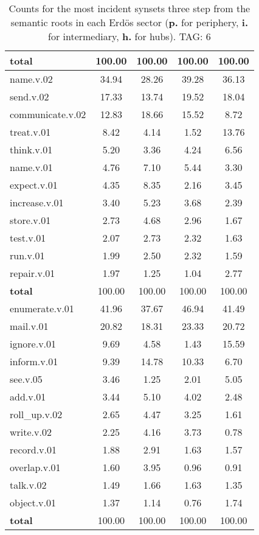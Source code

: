 \begin{table}[h!]
\begin{center}
\begin{tabular}{| l || c | c | c | c |}
{{\bf total}} & 100.00  & 100.00  & 100.00  & 100.00 \\\hline\hline\hline
name.v.02 & 34.94  & 28.26  & 39.28  & 36.13 \\\hline
send.v.02 & 17.33  & 13.74  & 19.52  & 18.04 \\\hline
communicate.v.02 & 12.83  & 18.66  & 15.52  & 8.72 \\\hline
treat.v.01 & 8.42  & 4.14  & 1.52  & 13.76 \\\hline
think.v.01 & 5.20  & 3.36  & 4.24  & 6.56 \\\hline
name.v.01 & 4.76  & 7.10  & 5.44  & 3.30 \\\hline
expect.v.01 & 4.35  & 8.35  & 2.16  & 3.45 \\\hline
increase.v.01 & 3.40  & 5.23  & 3.68  & 2.39 \\\hline
store.v.01 & 2.73  & 4.68  & 2.96  & 1.67 \\\hline
test.v.01 & 2.07  & 2.73  & 2.32  & 1.63 \\\hline
run.v.01 & 1.99  & 2.50  & 2.32  & 1.59 \\\hline
repair.v.01 & 1.97  & 1.25  & 1.04  & 2.77 \\\hline\hline
{{\bf total}} & 100.00  & 100.00  & 100.00  & 100.00 \\\hline\hline\hline
enumerate.v.01 & 41.96  & 37.67  & 46.94  & 41.49 \\\hline
mail.v.01 & 20.82  & 18.31  & 23.33  & 20.72 \\\hline
ignore.v.01 & 9.69  & 4.58  & 1.43  & 15.59 \\\hline
inform.v.01 & 9.39  & 14.78  & 10.33  & 6.70 \\\hline
see.v.05 & 3.46  & 1.25  & 2.01  & 5.05 \\\hline
add.v.01 & 3.44  & 5.10  & 4.02  & 2.48 \\\hline
roll\_up.v.02 & 2.65  & 4.47  & 3.25  & 1.61 \\\hline
write.v.02 & 2.25  & 4.16  & 3.73  & 0.78 \\\hline
record.v.01 & 1.88  & 2.91  & 1.63  & 1.57 \\\hline
overlap.v.01 & 1.60  & 3.95  & 0.96  & 0.91 \\\hline
talk.v.02 & 1.49  & 1.66  & 1.63  & 1.35 \\\hline
object.v.01 & 1.37  & 1.14  & 0.76  & 1.74 \\\hline\hline
{{\bf total}} & 100.00  & 100.00  & 100.00  & 100.00 \\\hline
\end{tabular}
\caption{Counts for the most incident synsets three step from the semantic roots in each Erd\"os sector ({\bf p.} for periphery, {\bf i.} for intermediary, {\bf h.} for hubs). TAG: 6}
\end{center}
\end{table}